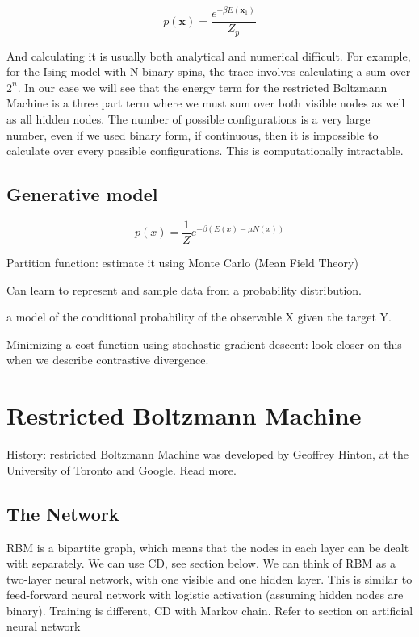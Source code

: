 \begin{equation}
p(\mathbf{x}) = \frac{e^{-\beta E(\mathbf{x}_1)}}{Z_p}
\end{equation}

And calculating it is usually both analytical and numerical difficult.
For example, for the Ising model with N binary spins, the trace involves calculating a sum over $2^n$. In our case we will see that the energy term for the restricted Boltzmann Machine is a three part term where we must sum over both visible nodes as well as all hidden nodes. The number of possible configurations is a very large number, even if we used binary form, if continuous, then it is impossible to calculate over every possible configurations. This is computationally intractable. 

\subsection{Generative model}

\begin{equation}
p(x) = \frac{1}{Z} e^{-\beta (E(x) - \mu N(x))}
\end{equation}

Partition function: estimate it using Monte Carlo (Mean Field Theory) 

Can learn to represent and sample data from a probability distribution.

a model of the conditional probability of the observable X given the target Y. 

Minimizing a cost function using stochastic gradient descent: look closer on this when we describe contrastive divergence. 

\section{Restricted Boltzmann Machine}\label{sec:rbm}

History: restricted Boltzmann Machine was developed by Geoffrey Hinton, at the University of Toronto and Google. Read more.

\subsection{The Network}

RBM is a bipartite graph, which means that the nodes in each layer can be dealt with separately. We can use CD, see section below. 
We can think of RBM as a two-layer neural network, with one visible and one hidden layer. This is similar to feed-forward neural network  with logistic activation (assuming hidden nodes are binary). Training is different, CD with Markov chain. Refer to section on artificial neural network

